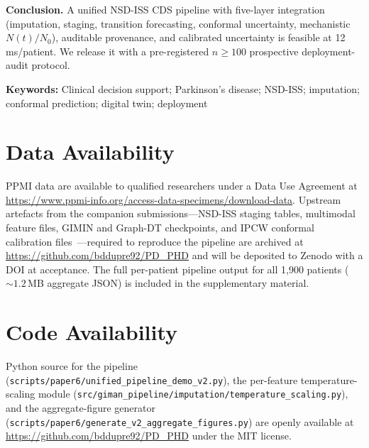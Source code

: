 \documentclass[11pt,letterpaper]{article}
\begin{document}
\noindent\textbf{Conclusion.}
A unified NSD-ISS CDS pipeline with five-layer integration (imputation, staging, transition forecasting, conformal uncertainty, mechanistic $N(t)/N_0$), auditable provenance, and calibrated uncertainty is feasible at 12\,ms/patient. We release it with a pre-registered $n \geq 100$ prospective deployment-audit protocol.

\vspace{0.5em}
\noindent\textbf{Keywords:} Clinical decision support; Parkinson's disease; NSD-ISS; imputation; conformal prediction; digital twin; deployment

\newpage






\section*{Data Availability}
PPMI data are available to qualified researchers under a Data Use Agreement at \url{https://www.ppmi-info.org/access-data-specimens/download-data}. Upstream artefacts from the companion submissions---NSD-ISS staging tables, multimodal feature files, GIMIN and Graph-DT checkpoints, and IPCW conformal calibration files~\cite{dupre2026paper1,dupre2026paper2,dupre2026paper3,dupre2026paper4,dupre2026paper5}---required to reproduce the pipeline are archived at \url{https://github.com/bddupre92/PD_PHD} and will be deposited to Zenodo with a DOI at acceptance. The full per-patient pipeline output for all 1,900 patients ($\sim 1.2$\,MB aggregate JSON) is included in the supplementary material.

\section*{Code Availability}
Python source for the pipeline (\texttt{scripts/paper6/unified\_pipeline\_demo\_v2.py}), the per-feature temperature-scaling module (\texttt{src/giman\_pipeline/imputation/temperature\_scaling.py}), and the aggregate-figure generator (\texttt{scripts/paper6/generate\_v2\_aggregate\_figures.py}) are openly available at \url{https://github.com/bddupre92/PD_PHD} under the MIT license.
\end{document}
